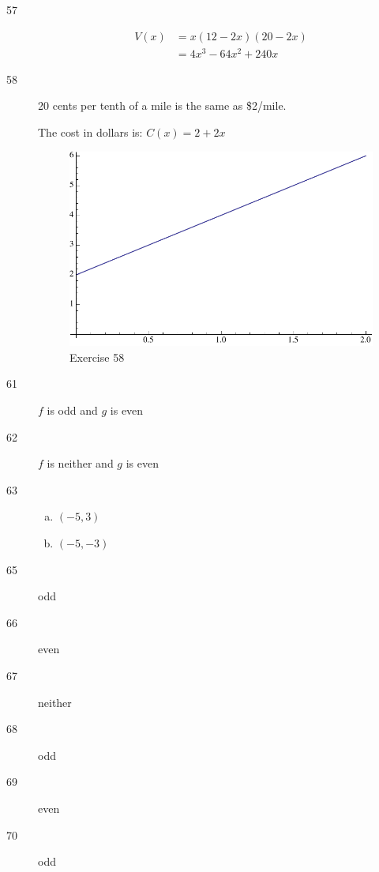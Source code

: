 \documentclass[letterpaper, landscape]{exam}
\begin{document}
\begin{description}

      \item[57]
        \begin{align*}
          V(x) & = x (12 - 2x) (20 - 2x) \\
               & = 4 x^3-64 x^2+240 x \end{align*}

      \item[58]
        20 cents per tenth of a mile is the same as \$2/mile.

        The cost in dollars is: $C(x) = 2 + 2 x$

        \begin{figure}[H]
          \centering
          \includegraphics[scale = 0.5]{ex58.pdf}
          \caption{Exercise 58}
          \label{fig:ex58}
        \end{figure}

      \item[61] $f$ is odd and $g$ is even 

      \item[62] $f$ is neither and $g$ is even

      \item[63]
        \begin{enumerate}[(a)]
          \item $(-5, 3)$
          \item $(-5, -3)$
        \end{enumerate}

      \item[65] odd
      \item[66] even
      \item[67] neither
      \item[68] odd
      \item[69] even
      \item[70] odd
        
    \end{description}
\end{document}

